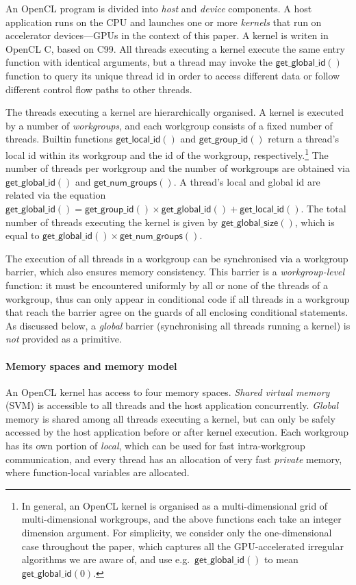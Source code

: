 \documentclass[numbers,nocopyrightspace,10pt]{sigplanconf}
\newcommand{\getgroupid}{\mathsf{get\_group\_id}}
\newcommand{\getnumgroups}{\mathsf{get\_num\_groups}}
\newcommand{\getlocalid}{\mathsf{get\_local\_id}}
\newcommand{\getglobalid}{\mathsf{get\_global\_id}}
\newcommand{\getlocalsize}{\mathsf{get\_global\_id}}
\newcommand{\getglobalsize}{\mathsf{get\_global\_size}}
\begin{document}
An OpenCL program is divided into \emph{host} and \emph{device}
components.  A host application runs on the CPU and launches one or
more \emph{kernels} that run on accelerator devices---GPUs in the
context of this paper.  A kernel is writen in OpenCL C, based on C99.
All threads executing a kernel execute the same entry function with
identical arguments, but a thread may invoke the $\getglobalid()$
function to query its unique thread id in order to access different
data or follow different control flow paths to other threads.

The threads executing a kernel are hierarchically organised.  A kernel
is executed by a number of \emph{workgroups}, and each workgroup
consists of a fixed number of threads.  Builtin functions
$\getlocalid()$ and $\getgroupid()$ return a thread's local id within
its workgroup and the id of the workgroup, respectively.\footnote{In general, an OpenCL kernel is organised as a multi-dimensional grid
of multi-dimensional workgroups, and the above functions each take
an integer dimension argument.  For simplicity, we consider only the
one-dimensional case throughout the paper, which captures all the
GPU-accelerated irregular algorithms we are aware of, and use
e.g.\ $\getglobalid()$ to mean $\getglobalid(0)$.
}  The number
of threads per workgroup and the number of workgroups are obtained via
$\getlocalsize()$ and $\getnumgroups()$.  A thread's local and global
id are related via the equation $\getglobalid() = \getgroupid() \times
\getlocalsize() + \getlocalid()$.  The total number of threads executing the kernel is given by $\getglobalsize()$, which is equal to $\getlocalsize()\times\getnumgroups()$.

The execution of all threads in a workgroup can be synchronised via a
workgroup barrier, which also ensures memory consistency.  This
barrier is a \emph{workgroup-level} function: it must be encountered
uniformly by all or none of the threads of a workgroup, thus can only
appear in conditional code if all threads in a workgroup that reach
the barrier agree on the guards of all enclosing conditional
statements.  As discussed below, a \emph{global} barrier
(synchronising all threads running a kernel) is \emph{not} provided as
a primitive.

\paragraph{Memory spaces and memory model}
An OpenCL kernel has access to four memory spaces.  \emph{Shared virtual
memory} (SVM) is accessible to all threads and the host application concurrently.  \emph{Global} memory is shared among all threads executing a
kernel, but can only be safely accessed by the host application before
or after kernel execution.  Each workgroup has its own portion of \emph{local},
which can be used for fast intra-workgroup communication, and every thread has
an allocation of very fast \emph{private} memory, where
function-local variables are allocated.
\end{document}
